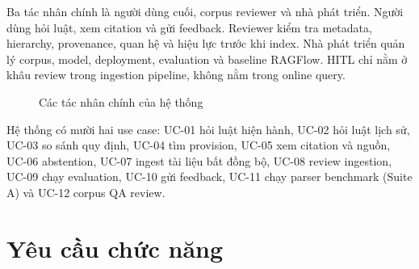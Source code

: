 \documentclass[a4paper,12pt]{extreport}
\begin{document}
Ba tác nhân chính là người dùng cuối, corpus reviewer và nhà phát triển. Người dùng hỏi luật, xem citation và gửi feedback. Reviewer kiểm tra metadata, hierarchy, provenance, quan hệ và hiệu lực trước khi index. Nhà phát triển quản lý corpus, model, deployment, evaluation và baseline RAGFlow. HITL chỉ nằm ở khâu review trong ingestion pipeline, không nằm trong online query.

\begin{figure}[H]
\centering
{}
\caption{Các tác nhân chính của hệ thống}
\end{figure}

Hệ thống có mười hai use case: UC-01 hỏi luật hiện hành, UC-02 hỏi luật lịch sử, UC-03 so sánh quy định, UC-04 tìm provision, UC-05 xem citation và nguồn, UC-06 abstention, UC-07 ingest tài liệu bất đồng bộ, UC-08 review ingestion, UC-09 chạy evaluation, UC-10 gửi feedback, UC-11 chạy parser benchmark (Suite A) và UC-12 corpus QA review.

\section{Yêu cầu chức năng}
\end{document}

